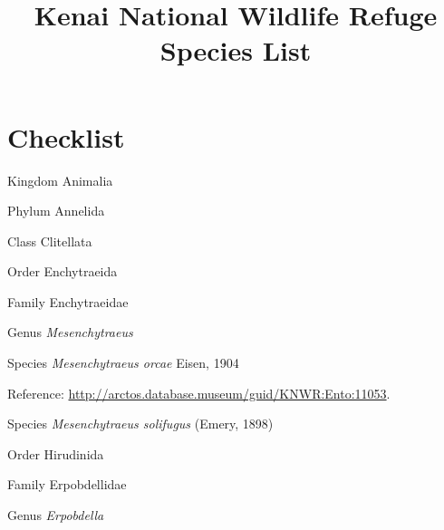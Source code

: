 \documentclass[9pt, article]{memoir}
\title{Kenai National Wildlife Refuge Species List}
\begin{document}
\maketitle

\chapter{Checklist}

\begin{multicols}{2}

\vspace{6pt}\noindent\hspace{0pt}Kingdom Animalia


\vspace{6pt}\noindent\hspace{6pt}Phylum Annelida


\vspace{6pt}\noindent\hspace{12pt}Class Clitellata


\vspace{6pt}\noindent\hspace{18pt}Order Enchytraeida


\vspace{6pt}\noindent\hspace{24pt}Family Enchytraeidae


\vspace{6pt}\noindent\hspace{30pt}Genus \textit{Mesenchytraeus}


\vspace{6pt}\noindent\hspace{36pt}Species \textit{Mesenchytraeus orcae} Eisen, 1904


\vspace{6pt}Reference: 
\url{http://arctos.database.museum/guid/KNWR:Ento:11053}.

\vspace{6pt}\noindent\hspace{36pt}Species \textit{Mesenchytraeus solifugus} (Emery, 1898)


\vspace{6pt}\noindent\hspace{18pt}Order Hirudinida


\vspace{6pt}\noindent\hspace{24pt}Family Erpobdellidae


\vspace{6pt}\noindent\hspace{30pt}Genus \textit{Erpobdella}



\end{multicols}
\end{document}
